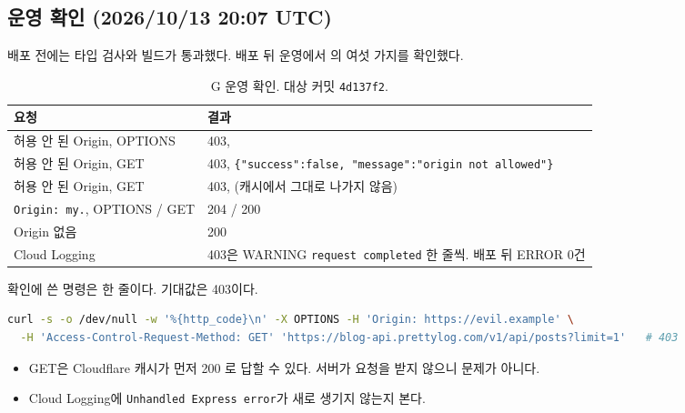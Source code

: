 \subsection{운영 확인 (2026/10/13 20:07 UTC)}\label{sec:05-cors-verify}

배포 전에는 타입 검사와 빌드가 통과했다.
배포 뒤 운영에서 의 여섯 가지를 확인했다.

\begin{table}[H]
  \caption{G 운영 확인. 대상 커밋 \texttt{4d137f2}.}\label{tab:05-cors-verify}
  \small
  \begin{tabularx}{\linewidth}{L{6cm} Y}
    \toprule
    요청 & 결과 \\
    \midrule
    허용 안 된 Origin, OPTIONS & 403,  \\
    \midrule
    허용 안 된 Origin, GET  & 403, \texttt{\{"success":false, "message":"origin not allowed"\}} \\
    \midrule
    허용 안 된 Origin, GET  & 403,  (캐시에서 그대로 나가지 않음) \\
    \midrule
    \texttt{Origin: my.}, OPTIONS / GET & 204 / 200  \\
    \midrule
    Origin 없음 & 200  \\
    \midrule
    Cloud Logging & 403은 WARNING \texttt{request completed} 한 줄씩. 배포 뒤 ERROR 0건 \\
    \bottomrule
  \end{tabularx}
\end{table}

확인에 쓴 명령은 한 줄이다. 기대값은 403이다.

\begin{lstlisting}[language=bash]
curl -s -o /dev/null -w '%{http_code}\n' -X OPTIONS -H 'Origin: https://evil.example' \
  -H 'Access-Control-Request-Method: GET' 'https://blog-api.prettylog.com/v1/api/posts?limit=1'   # 403
\end{lstlisting}

\begin{itemize}[nosep]
  \item GET은 Cloudflare 캐시가 먼저 200 로 답할 수 있다. 서버가 요청을 받지 않으니 문제가 아니다.
  \item Cloud Logging에 \texttt{Unhandled Express error}가 새로 생기지 않는지 본다.
\end{itemize}

